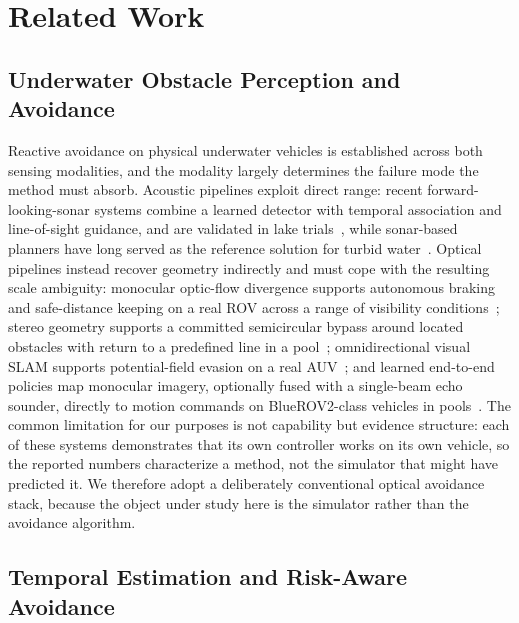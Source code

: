 \section{Related Work}
\label{sec:related}

\subsection{Underwater Obstacle Perception and Avoidance}

Reactive avoidance on physical underwater vehicles is established across
both sensing modalities, and the modality largely determines the failure
mode the method must absorb. Acoustic pipelines exploit direct range: recent
forward-looking-sonar systems combine a learned detector with temporal
association and line-of-sight guidance, and are validated in lake
trials~\cite{li2026underwat}, while sonar-based planners have long served as
the reference solution for turbid water~\cite{mane2024eroasdef}. Optical
pipelines instead recover geometry indirectly and must cope with the
resulting scale ambiguity: monocular optic-flow divergence supports
autonomous braking and safe-distance keeping on a real ROV across a range of
visibility conditions~\cite{bergantin2024realtime}; stereo geometry supports
a committed semicircular bypass around located obstacles with return to a
predefined line in a pool~\cite{zhang2022binocula}; omnidirectional visual
SLAM supports potential-field evasion on a real
AUV~\cite{ochoa2022collisio}; and learned end-to-end policies map monocular
imagery, optionally fused with a single-beam echo sounder, directly to
motion commands on BlueROV2-class vehicles in
pools~\cite{yang2022monocula,lin2024uivnavun,yang2025duvindif}. The common
limitation for our purposes is not capability but evidence structure: each
of these systems demonstrates that its own controller works on its own
vehicle, so the reported numbers characterize a method, not the simulator
that might have predicted it. We therefore adopt a deliberately conventional
optical avoidance stack, because the object under study here is the
simulator rather than the avoidance algorithm.

\subsection{Temporal Estimation and Risk-Aware Avoidance}

